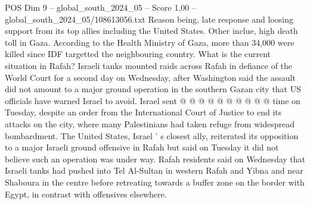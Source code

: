 \begin{textsample}{POS Dim 9 – global\_south\_2024\_05 – Score 1.00 – global\_south\_2024\_05/108613056.txt}
Reason being, late response and loosing support from its top allies including the United States.
Other inclue, high death toll in Gaza.
According to the Health Ministry of Gaza, more than 34,000 were killed since IDF targetted the neighbouring country.
What is the current situation in Rafah?
Israeli tanks mounted raids across Rafah in defiance of the World Court for a second day on Wednesday, after Washington said the assault did not amount to a major ground operation in the southern Gazan city that US officials have warned Israel to avoid.
Israel sent @ @ @ @ @ @ @ @ @ @ time on Tuesday, despite an order from the International Court of Justice to end its attacks on the city, where many Palestinians had taken refuge from widespread bombardment.
The United States, Israel ' s closest ally, reiterated its opposition to a major Israeli ground offensive in Rafah but said on Tuesday it did not believe such an operation was under way.
Rafah residents said on Wednesday that Israeli tanks had pushed into Tel Al-Sultan in western Rafah and Yibna and near Shaboura in the centre before retreating towards a buffer zone on the border with Egypt, in contrast with offensives elsewhere.

\end{textsample}
